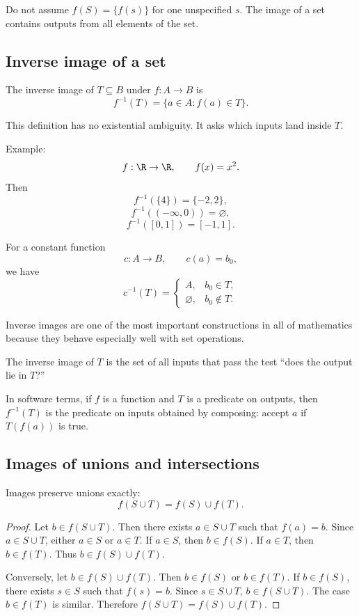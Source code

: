 \begin{trapbox}
Do not assume $f(S)=\{f(s)\}$ for one unspecified $s$. The image of a set contains outputs from all elements of the set.
\end{trapbox}

\subsection{Inverse image of a set}

The inverse image of $T\subseteq B$ under $f:A\to B$ is
\[
f^{-1}(T)=\{a\in A:f(a)\in T\}.
\]

This definition has no existential ambiguity. It asks which inputs land inside $T$.

Example:
\[
f:\R\to\R,\qquad f(x)=x^2.
\]
Then
\[
f^{-1}(\{4\})=\{-2,2\},
\]
\[
f^{-1}((-\infty,0))=\varnothing,
\]
\[
f^{-1}([0,1])=[-1,1].
\]

For a constant function
\[
c:A\to B,\qquad c(a)=b_0,
\]
we have
\[
c^{-1}(T)=
\begin{cases}
A,&b_0\in T,\\
\varnothing,&b_0\notin T.
\end{cases}
\]

Inverse images are one of the most important constructions in all of mathematics because they behave especially well with set operations.

\begin{intuitionbox}
The inverse image of $T$ is the set of all inputs that pass the test ``does the output lie in $T$?''
\end{intuitionbox}

In software terms, if $f$ is a function and $T$ is a predicate on outputs, then $f^{-1}(T)$ is the predicate on inputs obtained by composing: accept $a$ if $T(f(a))$ is true.

\subsection{Images of unions and intersections}

Images preserve unions exactly:
\[
f(S\cup T)=f(S)\cup f(T).
\]

\begin{proof}
Let $b\in f(S\cup T)$. Then there exists $a\in S\cup T$ such that $f(a)=b$. Since $a\in S\cup T$, either $a\in S$ or $a\in T$. If $a\in S$, then $b\in f(S)$. If $a\in T$, then $b\in f(T)$. Thus $b\in f(S)\cup f(T)$.

Conversely, let $b\in f(S)\cup f(T)$. Then $b\in f(S)$ or $b\in f(T)$. If $b\in f(S)$, there exists $s\in S$ such that $f(s)=b$. Since $s\in S\cup T$, $b\in f(S\cup T)$. The case $b\in f(T)$ is similar. Therefore $f(S\cup T)=f(S)\cup f(T)$.
\end{proof}

